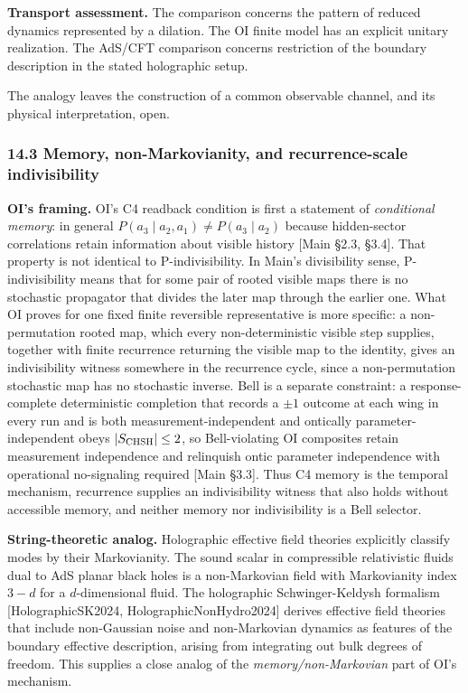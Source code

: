 \documentclass[
]{article}
\begin{document}
\textbf{Transport assessment.} The comparison concerns the pattern of
reduced dynamics represented by a dilation. The OI finite model has an
explicit unitary realization. The AdS/CFT comparison concerns
restriction of the boundary description in the stated holographic setup.

The analogy leaves the construction of a common observable channel, and
its physical interpretation, open.

\hypertarget{memory-non-markovianity-and-recurrence-scale-indivisibility}{%
\subsubsection{14.3 Memory, non-Markovianity, and recurrence-scale
indivisibility}\label{memory-non-markovianity-and-recurrence-scale-indivisibility}}

\textbf{OI's framing.} OI's C4 readback condition is first a statement
of \emph{conditional memory}: in general
\(P(a_3\mid a_2,a_1) \neq P(a_3\mid a_2)\) because hidden-sector
correlations retain information about visible history {[}Main §2.3,
§3.4{]}. That property is not identical to P-indivisibility. In Main's
divisibility sense, P-indivisibility means that for some pair of rooted
visible maps there is no stochastic propagator that divides the later
map through the earlier one. What OI proves for one fixed finite
reversible representative is more specific: a non-permutation rooted
map, which every non-deterministic visible step supplies, together with
finite recurrence returning the visible map to the identity, gives an
indivisibility witness somewhere in the recurrence cycle, since a
non-permutation stochastic map has no stochastic inverse. Bell is a
separate constraint: a response-complete deterministic completion that
records a \(\pm1\) outcome at each wing in every run and is both
measurement-independent and ontically parameter-independent obeys
\(|S_{\rm CHSH}|\le2\), so Bell-violating OI composites retain
measurement independence and relinquish ontic parameter independence
with operational no-signaling required {[}Main §3.3{]}. Thus C4 memory
is the temporal mechanism, recurrence supplies an indivisibility witness
that also holds without accessible memory, and neither memory nor
indivisibility is a Bell selector.

\textbf{String-theoretic analog.} Holographic effective field theories
explicitly classify modes by their Markovianity. The sound scalar in
compressible relativistic fluids dual to AdS planar black holes is a
non-Markovian field with Markovianity index \(3-d\) for a
\(d\)-dimensional fluid. The holographic Schwinger-Keldysh formalism
{[}HolographicSK2024, HolographicNonHydro2024{]} derives effective field
theories that include non-Gaussian noise and non-Markovian dynamics as
features of the boundary effective description, arising from integrating
out bulk degrees of freedom. This supplies a close analog of the
\emph{memory/non-Markovian} part of OI's mechanism.
\end{document}
